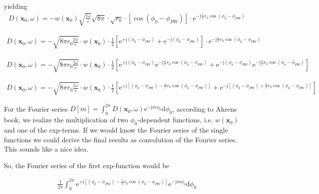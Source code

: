 \documentclass[a4paper,BCOR=15mm,10pt,twoside]{scrartcl}
\newcommand\e{\mathrm{e}}  %
\newcommand\im{\mathrm{j}}  %
\newcommand\fsd{\mathrm{d}}  %
\begin{document}
yielding
\begin{align}
D(\mathbf{x}_0,\omega) = -w(\mathbf{x}_0) \sqrt{\frac{\mathrm{j \omega}}{c}} \sqrt{8 \pi} \cdot
\sqrt{r_0} \cdot
[\cos(\phi_0-\phi_{PW})]
\cdot
\mathrm{e}^{- \mathrm{j} \frac{\omega}{c} r_0
\cos(\phi_0-\phi_{PW})}
\end{align}

\begin{align}
D(\mathbf{x}_0,\omega) = -\sqrt{8 \pi r_0 \frac{\mathrm{j \omega}}{c}} \cdot
w(\mathbf{x}_0) \cdot
\frac{1}{2}[\mathrm{e}^{+\mathrm{j}(\phi_0-\phi_{PW})}+\mathrm{e}^{-\mathrm{j}(\phi_0-\phi_{PW})}]
\cdot
\mathrm{e}^{- \mathrm{j} \frac{\omega}{c} r_0
\cos(\phi_0-\phi_{PW})}
\end{align}

\begin{align}
D(\mathbf{x}_0,\omega) = -\sqrt{8 \pi r_0 \frac{\mathrm{j \omega}}{c}} \cdot
w(\mathbf{x}_0) \cdot
\frac{1}{2}[
\mathrm{e}^{+\mathrm{j}(\phi_0-\phi_{PW})}\mathrm{e}^{- \mathrm{j} \frac{\omega}{c} r_0
\cos(\phi_0-\phi_{PW})}
+\mathrm{e}^{-\mathrm{j}(\phi_0-\phi_{PW})}\mathrm{e}^{- \mathrm{j} \frac{\omega}{c} r_0
\cos(\phi_0-\phi_{PW})}
]
\end{align}

\begin{align}
D(\mathbf{x}_0,\omega) = -\sqrt{8 \pi r_0 \frac{\mathrm{j \omega}}{c}} \cdot
w(\mathbf{x}_0) \cdot
\frac{1}{2}[
\mathrm{e}^{+\mathrm{j}[(\phi_0-\phi_{PW})-\frac{\omega}{c} r_0
\cos(\phi_0-\phi_{PW})]}
+\mathrm{e}^{-\mathrm{j}[(\phi_0-\phi_{PW})+\frac{\omega}{c} r_0
\cos(\phi_0-\phi_{PW})]}
]
\end{align}

For the Fourier series
$D[m] = \int_0^{2\pi} D(\mathbf{x}_0,\omega) \mathrm{e}^{-\mathrm{j} m \phi_0}\mathrm{d}\phi_0$, according to Ahrens book, we realize the multiplication of two $\phi_0$-dependent functions, i.e. $w(\mathbf{x}_0)$ and one of the exp-terms. If we would know the Fourier series of the single functions we could derive the final results as convolution of the Fourier series. This sounds like a nice idea.

So, the Fourier series of the first exp-function would be

\begin{align}
\frac{1}{2\pi}\int_0^{2\pi}
\mathrm{e}^{+\mathrm{j}[(\phi_0-\phi_{PW})-\frac{\omega}{c} r_0
\cos(\phi_0-\phi_{PW})]}
\e^{- \im m \phi_0 } \fsd \phi_0
\end{align}
\end{document}
